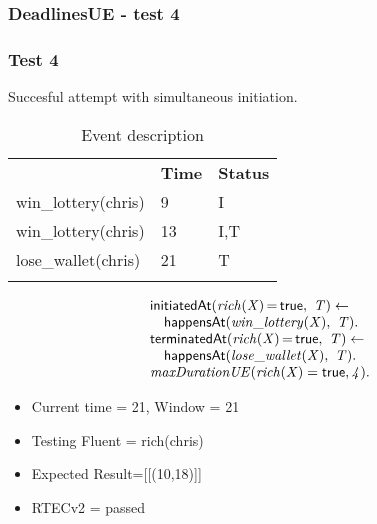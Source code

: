 \documentclass[8pt]{beamer}
\DeclareMathOperator{\val}{=}  %
\def \patsize {}
\def\happensAt{\textsf{\patsize happensAt}}
\def\initiatedAt{\textsf{\patsize initiatedAt}}
\def\terminatedAt{\textsf{\patsize terminatedAt}}
\def\true{\textsf{\patsize true}}
\newenvironment{mysplit}%
  {\arraycolsep 0pt \begin{array}{l}}%
  {\end{array}}
\begin{document}
\begin{frame}
    \frametitle{DeadlinesUE - test 4}
    \subsubsection{Test 4}
    \small
    Succesful attempt with simultaneous initiation.\linebreak
    \begin{minipage}{0.48\linewidth}
        \begin{table}[t!]
            \caption{Event description}
            \begin{center}

                \begin{tabular}{lll}
                    \hline\noalign{\smallskip}
                    \multicolumn{1}{l}{\textbf{Event}} & \multicolumn{1}{c}{\textbf{Time}} & \multicolumn{1}{c}{\textbf{Status}} \\
                    win\_lottery(chris)& 9 & I\\
                    win\_lottery(chris)& 13 & I,T\\
                    lose\_wallet(chris)& 21 & T\\
                    \noalign{\smallskip}
                    \hline
                \end{tabular}
            \end{center}
        \end{table}
    \end{minipage}
    \begin{minipage}{0.48\linewidth}
        \begin{align*}
            \begin{mysplit}
                \initiatedAt\mathit{(rich(X)\val\true,\ T) \leftarrow}\\
                \quad    \happensAt\mathit{(win\_lottery(X),\ T).}\\
                \terminatedAt\mathit{(rich(X)\val\true,\ T) \leftarrow}\\
                \quad    \happensAt\mathit{(lose\_wallet(X),\ T)}.\\
                \mathit{maxDurationUE(rich(X)=\true,4)}.\\
            \end{mysplit}
        \end{align*}
    \end{minipage}
    \begin{itemize}
        \item Current time = 21, Window = 21
        \item Testing Fluent = rich(chris)
        \item Expected Result=[[(10,18)]]
        \item RTECv2 = passed
    \end{itemize}
\end{frame}
\end{document}
